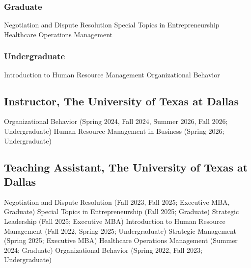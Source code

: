 \subsubsection*{Graduate}

\begin{entries}[\cvdatewwide]
Negotiation and Dispute Resolution
Special Topics in Entrepreneurship
Healthcare Operations Management
\end{entries}

\subsubsection*{Undergraduate}

\begin{entries}[\cvdatewwide]
Introduction to Human Resource Management
Organizational Behavior
\end{entries}

\else
\subsection*{Instructor, The University of Texas at Dallas}

\begin{entries}
\entn{}Organizational Behavior (Spring 2024, Fall 2024, Summer 2026, Fall 2026; Undergraduate)
\entn{}Human Resource Management in Business (Spring 2026; Undergraduate)
\end{entries}

\subsection*{Teaching Assistant, The University of Texas at Dallas}

\begin{entries}
\entn{}Negotiation and Dispute Resolution (Fall 2023, Fall 2025; Executive MBA, Graduate)
\entn{}Special Topics in Entrepreneurship (Fall 2025; Graduate)
\entn{}Strategic Leadership (Fall 2025; Executive MBA)
\entn{}Introduction to Human Resource Management (Fall 2022, Spring 2025; Undergraduate)
\entn{}Strategic Management (Spring 2025; Executive MBA)
\entn{}Healthcare Operations Management (Summer 2024; Graduate)
\entn{}Organizational Behavior (Spring 2022, Fall 2023; Undergraduate)
\end{entries}
\fi


